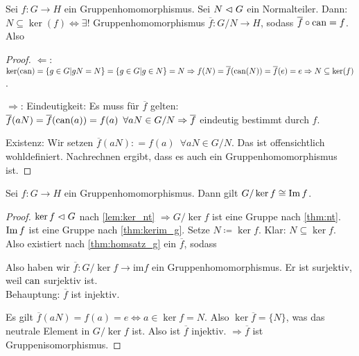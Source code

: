 \documentclass[12pt,a4paper]{scrartcl}
\begin{document}
\begin{satz}[Homomorphiesatz] \label{thm:homsatz_g}
	Sei $f\colon G\to H$ ein Gruppenhomomorphismus. Sei $N\vartriangleleft G$ ein Normalteiler. Dann: $N\subseteq \ker(f)\Leftrightarrow \exists!$ Gruppenhomomorphismus $\overline{f}\colon G/N\to H$, sodass $\overline{f}\circ \operatorname{can} = f$. Also 
	
	\begin{center}
	\end{center}
\end{satz}


\begin{proof}
	\glqq $\Leftarrow$\grqq: $\operatorname{ker}(\operatorname{can}) = \{g\in G|gN = N\} = \{g\in G|g\in N\} = N \Rightarrow f(N) = \overline{f}(\operatorname{can}(N)) = \overline{f}(e) = e\Rightarrow N\subseteq \operatorname{ker}(f)$.
	
	\noindent \glqq $\Rightarrow$\grqq: Eindeutigkeit: Es muss für $\overline{f}$ gelten: $\overline{f}(aN)=\overline{f}(\operatorname{can}(a)) = f(a)\enspace \forall aN\in G/N\Rightarrow \overline{f}$ eindeutig bestimmt durch $f$.
	
	Existenz: Wir setzen $\overline{f}(aN): = f(a)\enspace \forall aN\in G/N$. Das ist offensichtlich wohldefiniert. Nachrechnen ergibt, dass es auch ein Gruppenhomomorphismus ist.
\end{proof}

\begin{kor}
	Sei $f\colon G\to H$ ein Gruppenhomomorphismus. Dann gilt $G/\operatorname{ker} f \cong \operatorname{Im} f$.
\end{kor}
\begin{proof}
	$\operatorname{ker} f\vartriangleleft G$ nach \cref{lem:ker_nt} $\Rightarrow G/\ker f$ ist eine Gruppe nach \cref{thm:nt}. $\operatorname{Im} f$ ist eine Gruppe nach \cref{thm:kerim_g}. Setze $N\coloneqq \ker f$. Klar: $N\subseteq \ker f$. Also existiert nach \cref{thm:homsatz_g} ein $\overline{f}$, sodass
	
	\begin{center}
	\end{center}
	
	Also haben wir $\overline{f}\colon G/\ker f\to \mbox{im}f$ ein Gruppenhomomorphismus. Er ist surjektiv, weil $\operatorname{can}$ surjektiv ist. \\
	Behauptung: $\overline{f}$ ist injektiv.
	
	Es gilt $\overline{f}(aN)=f(a) = e \Leftrightarrow a\in \ker f = N$. Also $\ker \overline{f} = \{N\}$, was das neutrale Element in $G/\ker f$ ist. Also ist $\overline{f}$ injektiv. $\Rightarrow \overline{f}$ ist Gruppenisomorphismus.
\end{proof}
\end{document}
